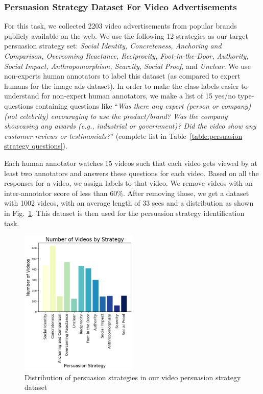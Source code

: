 \subsubsection{Persuasion Strategy Dataset For Video Advertisements}
For this task, we collected 2203 video advertisements from popular brands publicly available on the web. We use the following 12 strategies as our target persuasion strategy set: \textit{Social Identity, Concreteness, Anchoring and Comparison, Overcoming Reactance, Reciprocity, Foot-in-the-Door, Authority, Social Impact, Anthropomorphism, Scarcity, Social Proof,} and \textit{Unclear}. We use non-experts human annotators to label this dataset (as compared to expert humans for the image ads dataset). In order to make the class labels easier to understand for non-expert human annotators, we make a list of 15 yes/no type-questions containing questions like ``\textit{Was there any expert (person or company) (not celebrity) encouraging to use the product/brand? Was the company showcasing any awards (e.g., industrial or government)? Did the video show any customer reviews or testimonials?}'' (complete list in Table~\ref{table:persuasion strategy questions}). 

Each human annotator watches 15 videos such that each video gets viewed by at least two annotators and answers these questions for each video. Based on all the responses for a video, we assign labels to that video. We remove videos with an inter-annotator score of less than 60\%. After removing those, we get a dataset with 1002 videos, with an average length of 33 secs and a distribution as shown in Fig.~\ref{fig:persuasion-strategy-dataset-distribution}. This dataset is then used for the persuasion strategy identification task. 


\begin{figure}[!h]
    \centering
    \includegraphics[width=0.5\textwidth]{images/video_strategies.png}
    \caption{Distribution of persuasion strategies in our video persuasion strategy dataset}
    \label{fig:persuasion-strategy-dataset-distribution}
\end{figure}


